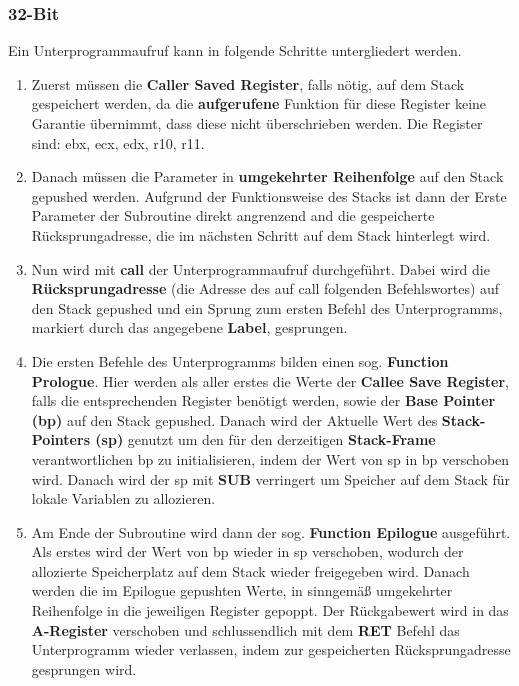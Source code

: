 \documentclass[12pt]{article}
\begin{document}
\subsubsection*{32-Bit}
Ein Unterprogrammaufruf kann in folgende Schritte untergliedert werden.
\begin{enumerate}
\item Zuerst müssen die \textbf{Caller Saved Register}, falls nötig, auf dem Stack gespeichert werden, da die \textbf{aufgerufene} Funktion für diese Register keine Garantie übernimmt, dass diese nicht überschrieben werden. Die Register sind: ebx, ecx, edx, r10, r11.

\item Danach müssen die Parameter in \textbf{umgekehrter Reihenfolge} auf den Stack gepushed werden. Aufgrund der Funktionsweise des Stacks ist dann der Erste Parameter der Subroutine direkt angrenzend and die gespeicherte Rücksprungadresse, die im nächsten Schritt auf dem Stack hinterlegt wird.

\item Nun wird mit \textbf{call} der Unterprogrammaufruf durchgeführt. Dabei wird die \textbf{Rücksprungadresse} (die Adresse des auf call folgenden Befehlswortes) auf den Stack gepushed und ein Sprung zum ersten Befehl des Unterprogramms, markiert durch das angegebene \textbf{Label}, gesprungen.

\item Die ersten Befehle des Unterprogramms bilden einen sog. \textbf{Function Prologue}. Hier werden als aller erstes die Werte der \textbf{Callee Save Register}, falls die entsprechenden Register benötigt werden, sowie der \textbf{Base Pointer (bp)} auf den Stack gepushed. Danach wird der Aktuelle Wert des \textbf{Stack-Pointers (sp)} genutzt um den für den derzeitigen \textbf{Stack-Frame} verantwortlichen bp zu initialisieren, indem der Wert von sp in bp verschoben wird. Danach wird der sp mit \textbf{SUB} verringert um Speicher auf dem Stack für lokale Variablen zu allozieren.

\item Am Ende der Subroutine wird dann der sog. \textbf{Function Epilogue} ausgeführt. Als erstes wird der Wert von bp wieder in sp verschoben, wodurch der allozierte Speicherplatz auf dem Stack wieder freigegeben wird. Danach werden die im Epilogue gepushten Werte, in sinngemäß umgekehrter Reihenfolge in die jeweiligen Register gepoppt. Der Rückgabewert wird in das \textbf{A-Register} verschoben und schlussendlich mit dem \textbf{RET} Befehl das Unterprogramm wieder verlassen, indem zur gespeicherten Rücksprungadresse gesprungen wird.  
\end{enumerate}
\end{document}
